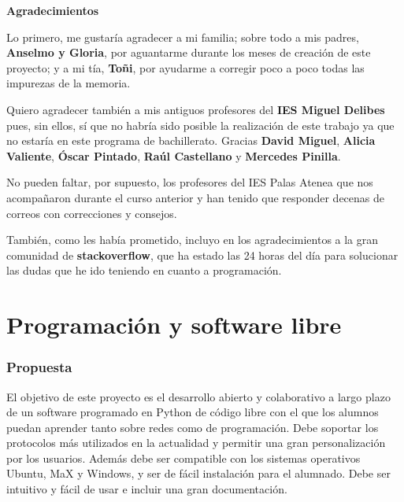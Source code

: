 \documentclass[a4paper, 11pt]{report} %
\begin{document}
\newpage
\setcounter{page}{6}
\vspace*{2.5cm}
\centerline{\color{chaptercolour}\normalfont\huge\bfseries Agradecimientos}
\vspace*{50pt}

Lo primero, me gustaría agradecer a mi familia; sobre todo a mis padres, \textbf{Anselmo y Gloria}, por aguantarme durante los meses de creación de este proyecto; y a mi tía, \textbf{Toñi}, por ayudarme a corregir poco a poco todas las impurezas de la memoria.

Quiero agradecer también a mis antiguos profesores del \textbf{IES Miguel Delibes} pues, sin ellos, sí que no habría sido posible la realización de este trabajo ya que no estaría en este programa de bachillerato. Gracias \textbf{David Miguel}, \textbf{Alicia Valiente}, \textbf{Óscar Pintado}, \textbf{Raúl Castellano} y \textbf{Mercedes Pinilla}.

No pueden faltar, por supuesto, los profesores del IES Palas Atenea que nos acompañaron durante el curso anterior y han tenido que responder decenas de correos con correcciones y consejos.

También, como les había prometido, incluyo en los agradecimientos a la gran comunidad de \textbf{stackoverflow}, que ha estado las 24 horas del día para solucionar las dudas que he ido teniendo en cuanto a programación.
\vspace*{\fill}


\setcounter{chapter}{0}    
\chapter{Programación y software libre}

\subsection*{Propuesta}
El objetivo de este proyecto es el desarrollo abierto  y colaborativo a largo plazo de un software programado en Python de código libre con el que los alumnos puedan aprender tanto sobre redes como de programación. Debe soportar los protocolos más utilizados en la actualidad y permitir una gran personalización por los usuarios. Además debe ser compatible con los sistemas operativos Ubuntu, MaX y Windows, y ser de fácil instalación para el alumnado. Debe ser intuitivo y fácil de usar e incluir una gran documentación.
\end{document}
